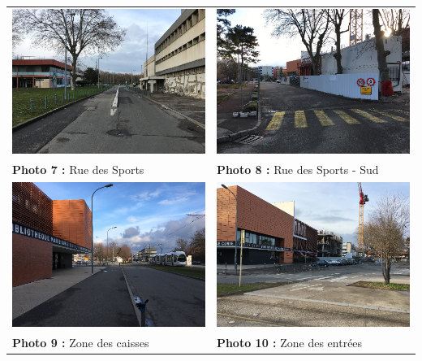 \documentclass[hidelinks, paper=a4, fontsize=13pt]{report}
\begin{document}
\begin{center}
\begin{tabular}{ll}
\includegraphics[width=.45\textwidth]{Annexes/Exports/Photo_7} & \includegraphics[width=.45\textwidth]{Annexes/Exports/Photo_8} \\
\textbf{Photo 7 :} Rue des Sports & \textbf{Photo 8 :} Rue des Sports - Sud
\vspace{0.2 cm}\\
\includegraphics[width=.45\textwidth]{Annexes/Exports/Photo_9} & \includegraphics[width=.45\textwidth]{Annexes/Exports/Photo_10} \\
\textbf{Photo 9 :} Zone des caisses & \textbf{Photo 10 :} Zone des entrées
\vspace{0.2 cm}\\

\end{tabular}
\end{center}
\end{document}
